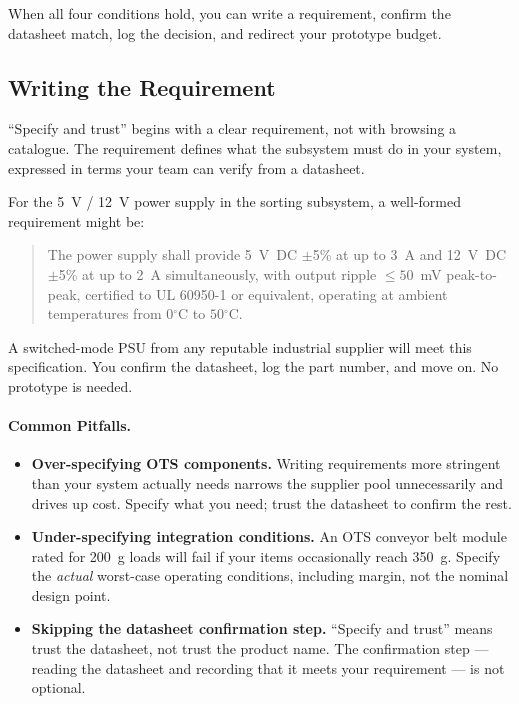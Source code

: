 When all four conditions hold, you can write a requirement, confirm the
datasheet match, log the decision, and redirect your prototype budget.

\subsection{Writing the Requirement}

``Specify and trust'' begins with a clear requirement, not with browsing a
catalogue.
The requirement defines what the subsystem must do in your system, expressed
in terms your team can verify from a datasheet.

For the 5~V / 12~V power supply in the sorting subsystem, a well-formed
requirement might be:

\begin{quote}
  The power supply shall provide 5~V~DC $\pm$5\% at up to 3~A and 12~V~DC
  $\pm$5\% at up to 2~A simultaneously, with output ripple $\leq 50$~mV
  peak-to-peak, certified to UL 60950-1 or equivalent, operating at ambient
  temperatures from $0{^\circ}$C to $50{^\circ}$C.
\end{quote}

A switched-mode PSU from any reputable industrial supplier will meet this
specification.
You confirm the datasheet, log the part number, and move on.
No prototype is needed.

\paragraph{Common Pitfalls.}
\begin{itemize}
  \item \textbf{Over-specifying OTS components.}
        Writing requirements more stringent than your system actually needs
        narrows the supplier pool unnecessarily and drives up cost.
        Specify what you need; trust the datasheet to confirm the rest.
  \item \textbf{Under-specifying integration conditions.}
        An OTS conveyor belt module rated for 200~g loads will fail if your
        items occasionally reach 350~g.
        Specify the \emph{actual} worst-case operating conditions, including
        margin, not the nominal design point.
  \item \textbf{Skipping the datasheet confirmation step.}
        ``Specify and trust'' means trust the datasheet, not trust the product
        name.
        The confirmation step --- reading the datasheet and recording that it
        meets your requirement --- is not optional.
\end{itemize}


